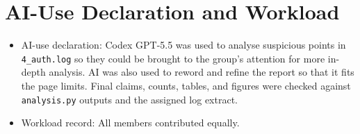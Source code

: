 \section{AI-Use Declaration and Workload}
\label{app:ai-workload}
\setcounter{table}{0}
\setcounter{figure}{0}
\begin{itemize}
    \item AI-use declaration: Codex GPT-5.5 was used to analyse suspicious points in \texttt{4\_auth.log} so they could be brought to the group's attention for more in-depth analysis. AI was also used to reword and refine the report so that it fits the page limits. Final claims, counts, tables, and figures were checked against \texttt{analysis.py} outputs and the assigned log extract.
    \item Workload record: All members contributed equally.
\end{itemize}

